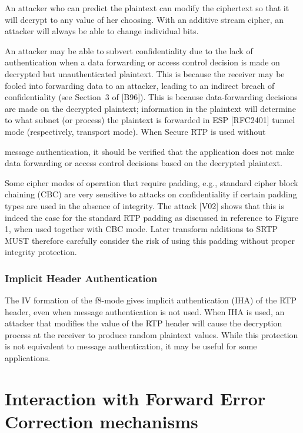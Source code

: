 \documentclass{article}
\begin{document}
An attacker who can predict the plaintext can modify the ciphertext so that it will decrypt to any value of her choosing.  With an additive stream cipher, an attacker will always be able to change individual bits.

An attacker may be able to subvert confidentiality due to the lack of authentication when a data forwarding or access control decision is made on decrypted but unauthenticated plaintext.  This is because the receiver may be fooled into forwarding data to an attacker, leading to an indirect breach of confidentiality (see Section~3 of [B96]). This is because data-forwarding decisions are made on the decrypted plaintext; information in the plaintext will determine to what subnet (or process) the plaintext is forwarded in ESP [RFC2401] tunnel mode (respectively, transport mode).  When Secure RTP is used without

message authentication, it should be verified that the application does not make data forwarding or access control decisions based on the decrypted plaintext.

Some cipher modes of operation that require padding, e.g., standard cipher block chaining (CBC) are very sensitive to attacks on confidentiality if certain padding types are used in the absence of integrity.  The attack [V02] shows that this is indeed the case for the standard RTP padding as discussed in reference to Figure 1, when used together with CBC mode.  Later transform additions to SRTP MUST therefore carefully consider the risk of using this padding without proper integrity protection.

\subsubsection{Implicit Header Authentication}

The IV formation of the f8-mode gives implicit authentication (IHA) of the RTP header, even when message authentication is not used. When IHA is used, an attacker that modifies the value of the RTP header will cause the decryption process at the receiver to produce random plaintext values.  While this protection is not equivalent to message authentication, it may be useful for some applications.

\section{Interaction with Forward Error Correction mechanisms}
\end{document}
